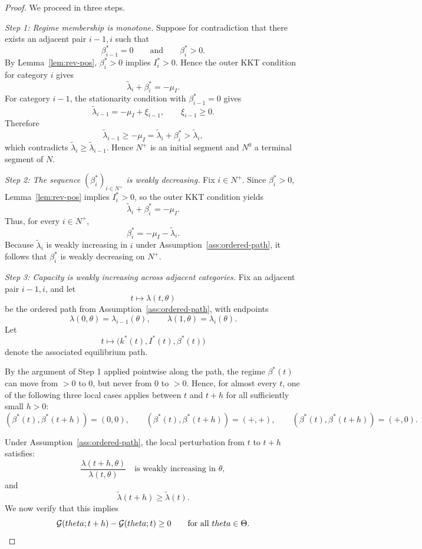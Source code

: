 \documentclass[master.tex]{subfiles}
\begin{document}
\begin{proof}
We proceed in three steps.


\noindent\textit{Step 1: Regime membership is monotone.}
Suppose for contradiction that there exists an adjacent pair \(i-1,i\) such that
\[
\beta_{i-1}^\ast=0
\qquad\text{and}\qquad
\beta_i^\ast>0.
\]
By Lemma~\ref{lem:rev-pos}, \(\beta_i^\ast>0\) implies \(I_i^\ast>0\). Hence the outer KKT condition for category \(i\) gives
\[
\tilde\lambda_i+\beta_i^\ast=-\mu_I.
\]
For category \(i-1\), the stationarity condition with \(\beta_{i-1}^\ast=0\) gives
\[
\tilde\lambda_{i-1}=-\mu_I+\xi_{i-1},
\qquad
\xi_{i-1}\ge 0.
\]
Therefore
\[
\tilde\lambda_{i-1}\ge -\mu_I=\tilde\lambda_i+\beta_i^\ast>\tilde\lambda_i,
\]
which contradicts \(\tilde\lambda_i\ge \tilde\lambda_{i-1}\). Hence \(N^+\) is an initial segment and \(N^0\) a terminal segment of \(N\).


\noindent\textit{Step 2: The sequence \((\beta_i^\ast)_{i\in N^+}\) is weakly decreasing.}
Fix \(i\in N^+\). Since \(\beta_i^\ast>0\), Lemma~\ref{lem:rev-pos} implies \(I_i^\ast>0\), so the outer KKT condition yields
\[
\tilde\lambda_i+\beta_i^\ast=-\mu_I.
\]
Thus, for every \(i\in N^+\),
\[
\beta_i^\ast=-\mu_I-\tilde\lambda_i.
\]
Because \(\tilde\lambda_i\) is weakly increasing in \(i\) under Assumption~\ref{ass:ordered-path}, it follows that \(\beta_i^\ast\) is weakly decreasing on \(N^+\).


\noindent\textit{Step 3: Capacity is weakly increasing across adjacent categories.}
Fix an adjacent pair \(i-1,i\), and let
\[
t\longmapsto \lambda(t,\theta)
\]
be the ordered path from Assumption~\ref{ass:ordered-path}, with endpoints
\[
\lambda(0,\theta)=\lambda_{i-1}(\theta),
\qquad
\lambda(1,\theta)=\lambda_i(\theta).
\]
Let
\[
t\longmapsto \bigl(k^\ast(t),I^\ast(t),\beta^\ast(t)\bigr)
\]
denote the associated equilibrium path.

By the argument of Step 1 applied pointwise along the path, the regime \(\beta^\ast(t)\) can move from \(>0\) to \(0\), but never from \(0\) to \(>0\). Hence, for almost every \(t\), one of the following three local cases applies between \(t\) and \(t+h\) for all sufficiently small \(h>0\):
\[
(\beta^\ast(t),\beta^\ast(t+h))=(0,0),\qquad
(\beta^\ast(t),\beta^\ast(t+h))=(+, +),\qquad
(\beta^\ast(t),\beta^\ast(t+h))=(+,0).
\]

Under Assumption~\ref{ass:ordered-path}, the local perturbation from \(t\) to \(t+h\) satisfies:
\[
\frac{\lambda(t+h,\theta)}{\lambda(t,\theta)}
\quad\text{is weakly increasing in }\theta,
\]
and
\[
\tilde\lambda(t+h)\ge \tilde\lambda(t).
\]
We now verify that this implies
\[
\mathcal{G}(theta;t+h)-\mathcal{G}(theta;t)\ge 0
\qquad\text{for all }theta\in\Theta.
\]


\end{proof}
\end{document}
